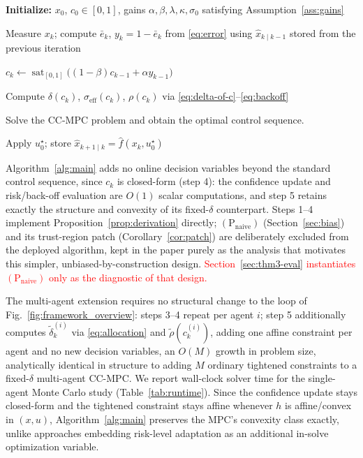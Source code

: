 \documentclass[letterpaper, 10 pt, conference]{ieeeconf}
\begin{document}
\begin{algorithm}[t]
\caption{Confidence-State Adaptive CC-MPC}
\label{alg:main}
\begin{algorithmic}[1]

\State \textbf{Initialize:} $x_0$, $c_0 \in [0,1]$, gains $\alpha,\beta,\lambda,\kappa,\sigma_0$ satisfying Assumption~\ref{ass:gains}


  \State Measure $x_k$; compute $\bar e_k$, $y_k=1-\bar e_k$ from \eqref{eq:error} using $\hat x_{k\mid k-1}$ stored from the previous iteration 

  \State $c_k \leftarrow \operatorname{sat}_{[0,1]}\big((1-\beta)c_{k-1}+\alpha y_{k-1}\big)$ 

  \State Compute $\delta(c_k)$, $\sigma_{\mathrm{eff}}(c_k)$, $\rho(c_k)$ via \eqref{eq:delta-of-c}--\eqref{eq:backoff} 

  \State Solve the CC-MPC problem and obtain the optimal control sequence.

  \State Apply $u_0^\star$; store $\hat x_{k+1\mid k}=\hat f(x_k,u_0^\star)$ 

\EndFor

\end{algorithmic}
\end{algorithm}

Algorithm~\ref{alg:main} adds no online decision variables beyond the standard control sequence, since $c_k$ is closed-form (step 4): the confidence update and risk/back-off evaluation are $O(1)$ scalar computations, and step 5 retains exactly the structure and convexity of its fixed-$\delta$ counterpart. Steps 1--4 implement Proposition~\ref{prop:derivation} directly; $(\mathrm P_{\mathrm{naive}})$ (Section~\ref{sec:bias}) and its trust-region patch (Corollary~\ref{cor:patch}) are deliberately excluded from the deployed algorithm, kept in the paper purely as the analysis that motivates this simpler, unbiased-by-construction design. \textcolor{red}{Section~\ref{sec:thm3-eval} instantiates $(\mathrm P_{\mathrm{naive}})$ only as the diagnostic of that design.}

The multi-agent extension requires no structural change to the loop of Fig.~\ref{fig:framework_overview}: steps 3--4 repeat per agent $i$; step 5 additionally computes $\tilde\delta_k^{(i)}$ via \eqref{eq:allocation} and $\tilde\rho(c_k^{(i)})$, adding one affine constraint per agent and no new decision variables,  an $O(M)$ growth in problem size, analytically identical in structure to adding $M$ ordinary tightened constraints to a fixed-$\delta$ multi-agent CC-MPC. We report wall-clock solver time for the single-agent Monte Carlo study (Table~\ref{tab:runtime}). Since the confidence update stays closed-form and the tightened constraint stays affine whenever $h$ is affine/convex in $(x,u)$, Algorithm~\ref{alg:main} preserves the MPC's convexity class exactly, unlike approaches embedding risk-level adaptation as an additional in-solve optimization variable.
\end{document}
